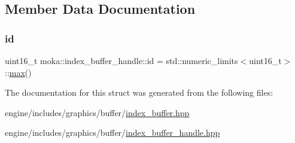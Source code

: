 \subsection{Member Data Documentation}
\mbox{\label{structmoka_1_1index__buffer__handle_afd594c47ab1e6cdbc18565870bd2941e}} 
\subsubsection{\texorpdfstring{id}{id}}
{\footnotesize\ttfamily uint16\+\_\+t moka\+::index\+\_\+buffer\+\_\+handle\+::id = std\+::numeric\+\_\+limits$<$uint16\+\_\+t$>$\+::\mbox{\hyperlink{namespacemoka_acf03408f89c521244763fb5f8746ce16a2ffe4e77325d9a7152f7086ea7aa5114}{max}}()}



The documentation for this struct was generated from the following files\+:\begin{DoxyCompactItemize}
\item 
engine/includes/graphics/buffer/\mbox{\hyperlink{index__buffer_8hpp}{index\+\_\+buffer.\+hpp}}\item 
engine/includes/graphics/buffer/\mbox{\hyperlink{index__buffer__handle_8hpp}{index\+\_\+buffer\+\_\+handle.\+hpp}}\end{DoxyCompactItemize}
